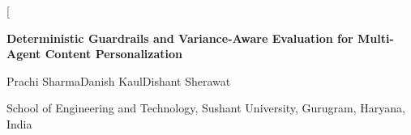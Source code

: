 \documentclass[9pt,twocolumn]{extarticle}
\newcommand{\figref}[1]{Fig.\ref{#1}}
\newcommand{\tabref}[1]{Table~\ref{#1}}
\newcommand{\tabnote}[1]{\par\vspace{2pt}\footnotesize\textit{Note:} #1}
\begin{document}

\twocolumn[
  \begin{@twocolumnfalse}
  \begin{center}
    {\large\bfseries Deterministic Guardrails and Variance-Aware
     Evaluation for Multi-Agent Content Personalization\par}
    \vspace{8pt}
    {\normalsize Prachi Sharma\quad Danish Kaul\quad Dishant Sherawat\par}
    \vspace{4pt}
    {\footnotesize School of Engineering and Technology,
     Sushant University, Gurugram, Haryana, India\par}
  \end{center}
  \vspace{10pt}


\end{@twocolumnfalse}
\end{document}
